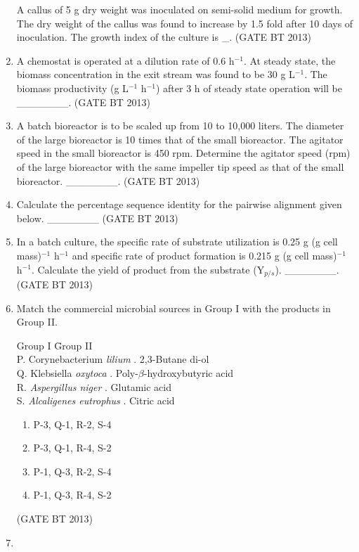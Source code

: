 \documentclass[journal,12pt,onecolumn]{IEEEtran}
\theoremstyle{remark}
\begin{document}
\begin{enumerate}
A callus of 5 g dry weight was inoculated on semi-solid medium for growth. The dry weight of the callus was found to increase by 1.5 fold after 10 days of inoculation. The growth index of the culture is \_.
\hfill (GATE BT 2013)
\item 

A chemostat is operated at a dilution rate of 0.6 h$^{-1}$. At steady state, the biomass concentration in the exit stream was found to be 30 g L$^{-1}$. The biomass productivity (g L$^{-1}$ h$^{-1}$) after 3 h of steady state operation will be \_\_\_\_\_\_\_.
\hfill (GATE BT 2013)

\item 

A batch bioreactor is to be scaled up from 10 to 10,000 liters. The diameter of the large bioreactor is 10 times that of the small bioreactor. The agitator speed in the small bioreactor is 450 rpm. Determine the agitator speed (rpm) of the large bioreactor with the same impeller tip speed as that of the small bioreactor. \_\_\_\_\_\_\_.
\hfill (GATE BT 2013)
\item 

Calculate the percentage sequence identity for the pairwise alignment given below. \_\_\_\_\_\_\_
\hfill (GATE BT 2013)
\item 

In a batch culture, the specific rate of substrate utilization is 0.25 g (g cell mass)$^{-1}$ h$^{-1}$ and specific rate of product formation is 0.215 g (g cell mass)$^{-1}$ h$^{-1}$. Calculate the yield of product from the substrate (Y$_{p/s}$). \_\_\_\_\_\_\_.
\hfill (GATE BT 2013)
\item 

Match the commercial microbial sources in Group I with the products in Group II.

\begin{tabbing}
Group I \hspace{3cm} \= Group II \\
P. Corynebacterium \textit{lilium} . 2,3-Butane di-ol \\
Q. Klebsiella \textit{oxytoca} . Poly-$\beta$-hydroxybutyric acid \\
R. \textit{Aspergillus niger} . Glutamic acid \\
S. \textit{Alcaligenes eutrophus} . Citric acid \\
\end{tabbing}

\begin{enumerate}[label=(\Alph*)]
    \item P-3, Q-1, R-2, S-4
    \item P-3, Q-1, R-4, S-2
    \item P-1, Q-3, R-2, S-4
    \item P-1, Q-3, R-4, S-2
\end{enumerate} 
\hfill (GATE BT 2013)
\item 


\end{enumerate}
\end{document}

